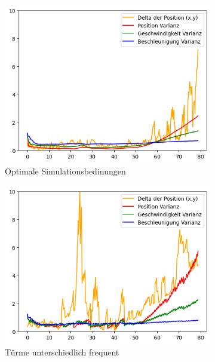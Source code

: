 \begin{figure}
    \begin{subfigure}{.333\textwidth}
        \centering
        \includegraphics[width=.9\linewidth]{Ergebnisse/plots_ungenauigkeiten/richtung/richtung_dyn_acc_basic.png}
        \caption{Optimale Simulationsbedinungen}
    \end{subfigure}    
    \begin{subfigure}{.333\textwidth}
        \centering
        \includegraphics[width=.9\linewidth]{Ergebnisse/plots_ungenauigkeiten/richtung/richtung_dyn_acc_freq.png}
        \caption{Türme unterschiedlich frequent}
    \end{subfigure}    
    \begin{subfigure}{.333\textwidth}
        \centering

\end{subfigure}
\end{figure}
